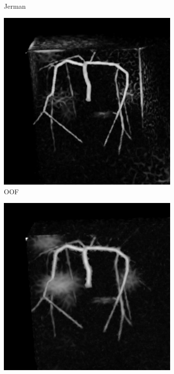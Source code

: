 \begin{figure}[!ht]
\begin{subfigure}[t]{0.32\textwidth}
    \caption{Jerman}
  \end{subfigure}
  \begin{subfigure}[t]{0.32\textwidth}
    \includegraphics[clip = true, trim = 80 80 80 80,width=\textwidth]{Images/Vascu_4_OOF_GM.png}
    \caption{OOF}
  \end{subfigure}
  \begin{subfigure}[t]{0.32\textwidth}
    \includegraphics[clip = true, trim = 80 80 80 80,width=\textwidth]{Images/Vascu_4_Meijering.png}

\end{subfigure}
\end{figure}
